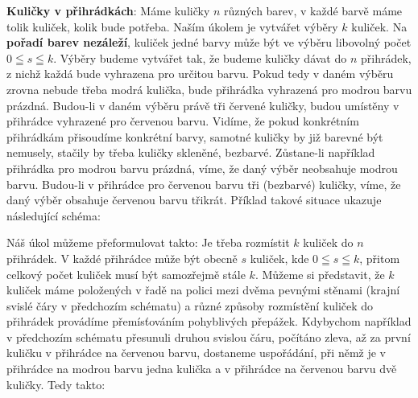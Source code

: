\begin{mdframed}[style=mdexam]
  \begin{example}\label{mai:exam009}
    \textbf{Kuličky v přihrádkách}:\newline
    Máme kuličky \(n\) různých barev, v každé barvě máme tolik kuliček, kolik bude potřeba. Naším
    úkolem je vytvářet výběry \(k\) kuliček. Na \textbf{pořadí barev nezáleží}, kuliček jedné barvy
    může být ve výběru libovolný počet \(0\leqq s \leqq k\). Výběry budeme vytvářet tak, že budeme
    kuličky dávat do \(n\) přihrádek, z nichž každá bude vyhrazena pro určitou barvu. Pokud tedy v
    daném výběru zrovna nebude třeba modrá kulička, bude přihrádka vyhrazená pro modrou barvu
    prázdná. Budou-li v daném výběru právě tři červené kuličky, budou umístěny v přihrádce vyhrazené
    pro červenou barvu. Vidíme, že pokud konkrétním přihrádkám přisoudíme konkrétní barvy, samotné
    kuličky by již barevné být nemusely, stačily by třeba kuličky skleněné, bezbarvé. Zůstane-li
    například přihrádka pro modrou barvu prázdná, víme, že daný výběr neobsahuje modrou barvu.
    Budou-li v přihrádce pro červenou barvu tři (bezbarvé) kuličky, víme, že daný výběr obsahuje
    červenou barvu třikrát. Příklad takové situace ukazuje následující schéma:
    
    {\centering
      \par}

    Náš úkol můžeme přeformulovat takto: Je třeba rozmístit \(k\) kuliček do \(n\) přihrádek. V
    každé přihrádce může být obecně \(s\) kuliček, kde \(0\leqq s \leqq k\), přitom celkový počet
    kuliček musí být samozřejmě stále \(k\). Můžeme si představit, že \(k\) kuliček máme položených
    v řadě na polici mezi dvěma pevnými stěnami (krajní svislé čáry v předchozím schématu) a různé
    způsoby rozmístění kuliček do přihrádek provádíme přemísťováním pohyblivých přepážek. Kdybychom
    například v předchozím schématu přesunuli druhou svislou čáru, počítáno zleva, až za první
    kuličku v přihrádce na červenou barvu, dostaneme uspořádání, při němž je v přihrádce na modrou
    barvu jedna kulička a v přihrádce na červenou barvu dvě kuličky. Tedy takto:

    {\centering
    \par}


\end{example}
\end{mdframed}
